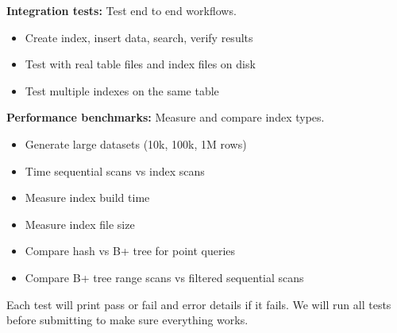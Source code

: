 \documentclass[11pt,a4paper]{article}
\begin{document}
\textbf{Integration tests:} Test end to end workflows.
\begin{itemize}
\item Create index, insert data, search, verify results
\item Test with real table files and index files on disk
\item Test multiple indexes on the same table
\end{itemize}

\textbf{Performance benchmarks:} Measure and compare index types.
\begin{itemize}
\item Generate large datasets (10k, 100k, 1M rows)
\item Time sequential scans vs index scans
\item Measure index build time
\item Measure index file size
\item Compare hash vs B+ tree for point queries
\item Compare B+ tree range scans vs filtered sequential scans
\end{itemize}

Each test will print pass or fail and error details if it fails. We will run all tests before submitting to make sure everything works.
\end{document}
